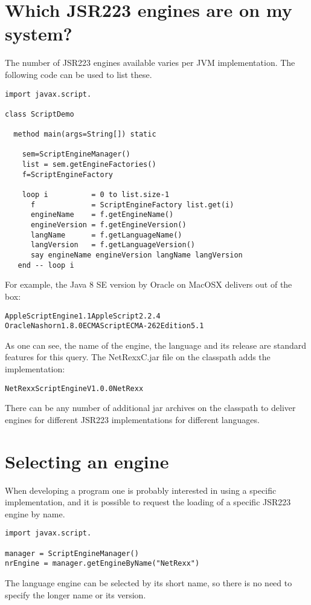 \section{Which JSR223 engines are on my system?}
The number of JSR223 engines available varies per JVM implementation. The following code can be used to list these.
\begin{lstlisting}[label=enumeratejsr223,caption=Enumerate the JSR223 Engines on a JVM]
import javax.script.

class ScriptDemo
  
  method main(args=String[]) static
    
    sem=ScriptEngineManager()
    list = sem.getEngineFactories()
    f=ScriptEngineFactory
    
    loop i          = 0 to list.size-1
      f             = ScriptEngineFactory list.get(i)
      engineName    = f.getEngineName()
      engineVersion = f.getEngineVersion()
      langName      = f.getLanguageName()
      langVersion   = f.getLanguageVersion()
      say engineName engineVersion langName langVersion
   end -- loop i

\end{lstlisting}
For example, the Java 8 SE version by Oracle on MacOSX delivers out of the box:
\begin{alltt}
AppleScriptEngine 1.1 AppleScript 2.2.4
Oracle Nashorn 1.8.0  ECMAScript ECMA - 262 Edition 5.1
\end{alltt}
As one can see, the name of the engine, the language and its release are standard features for this query. The NetRexxC.jar file on the classpath adds the \nr{} implementation:
\begin{alltt}
NetRexx Script Engine V1.0.0 NetRexx \nrversion{}
\end{alltt}
There can be any number of additional jar archives on the classpath to deliver engines for different JSR223 implementations for different languages.
\section{Selecting an engine}
When developing a program one is probably interested in using a specific implementation, and it is possible to request the loading of a specific JSR223 engine by name.
\begin{lstlisting}[label=choosingjsr223,caption=Choosing an engine]
import javax.script.

manager = ScriptEngineManager()
nrEngine = manager.getEngineByName("NetRexx")
\end{lstlisting}
The language engine can be selected by its short name, so there is no need to specify the longer name or its version.
